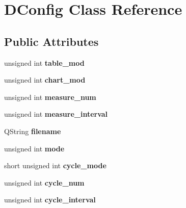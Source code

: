 \hypertarget{class_d_config}{
\section{DConfig Class Reference}
\label{class_d_config}
}
\subsection*{Public Attributes}
\begin{DoxyCompactItemize}
\item 
\hypertarget{class_d_config_aa2010c97b6b958035b554ae7eaaf5503}{
unsigned int {\bfseries table\_\-mod}}
\label{class_d_config_aa2010c97b6b958035b554ae7eaaf5503}

\item 
\hypertarget{class_d_config_a979590d630b81223da9f29a088961091}{
unsigned int {\bfseries chart\_\-mod}}
\label{class_d_config_a979590d630b81223da9f29a088961091}

\item 
\hypertarget{class_d_config_a0f4a14d70b0fd639b7e697031272fa5b}{
unsigned int {\bfseries measure\_\-num}}
\label{class_d_config_a0f4a14d70b0fd639b7e697031272fa5b}

\item 
\hypertarget{class_d_config_a8038ac83ad9d15884800e4e479e35c8b}{
unsigned int {\bfseries measure\_\-interval}}
\label{class_d_config_a8038ac83ad9d15884800e4e479e35c8b}

\item 
\hypertarget{class_d_config_a213a965c39046e3faa33a7d7cbdf9de1}{
QString {\bfseries filename}}
\label{class_d_config_a213a965c39046e3faa33a7d7cbdf9de1}

\item 
\hypertarget{class_d_config_a93f3cf9bf37010191cdacb01d6049af7}{
unsigned int {\bfseries mode}}
\label{class_d_config_a93f3cf9bf37010191cdacb01d6049af7}

\item 
\hypertarget{class_d_config_a3685b26c5b904e22b5cdc1a69e6efb9e}{
short unsigned int {\bfseries cycle\_\-mode}}
\label{class_d_config_a3685b26c5b904e22b5cdc1a69e6efb9e}

\item 
\hypertarget{class_d_config_a7ef6822f755e70db56a570b51e72f289}{
unsigned int {\bfseries cycle\_\-num}}
\label{class_d_config_a7ef6822f755e70db56a570b51e72f289}

\item 
\hypertarget{class_d_config_a740a1d70659efc7a3be4b3559ad621a1}{
unsigned int {\bfseries cycle\_\-interval}}
\label{class_d_config_a740a1d70659efc7a3be4b3559ad621a1}


\end{DoxyCompactItemize}
